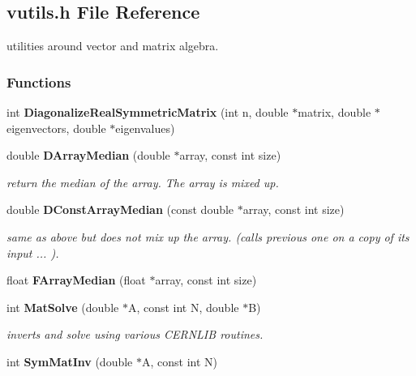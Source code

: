 \subsection{vutils.h File Reference}
\label{vutils_h}
utilities around vector and matrix algebra. 


\subsubsection*{Functions}
\begin{CompactItemize}
\item 
int {\bf Diagonalize\-Real\-Symmetric\-Matrix} (int n, double $\ast$matrix, double $\ast$eigenvectors, double $\ast$eigenvalues)
\item 
double {\bf DArray\-Median} (double $\ast$array, const int size)
\begin{CompactList}\small\item\em return the median of the array. The array is mixed up.\item\end{CompactList}\item 
{}
double {\bf DConst\-Array\-Median} (const double $\ast$array, const int size)\label{vutils_h_a2}

\begin{CompactList}\small\item\em same as above but does not mix up the array. (calls previous one on a copy of its input ... ).\item\end{CompactList}\item 
{}
float {\bf FArray\-Median} (float $\ast$array, const int size)\label{vutils_h_a3}

\item 
{}
int {\bf Mat\-Solve} (double $\ast$A, const int N, double $\ast$B)\label{vutils_h_a4}

\begin{CompactList}\small\item\em inverts and solve using various CERNLIB routines.\item\end{CompactList}\item 
{}
int {\bf Sym\-Mat\-Inv} (double $\ast$A, const int N)\label{vutils_h_a5}


\end{CompactItemize}
